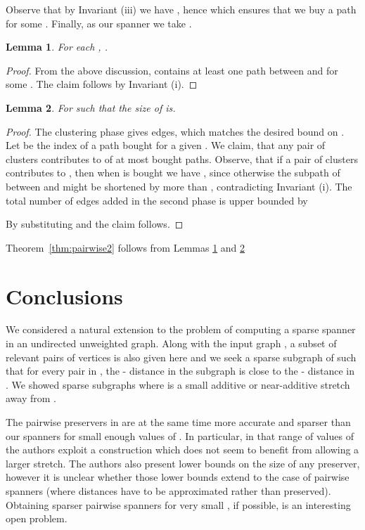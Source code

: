 \documentclass[a4paper,11pt]{article}
\newtheorem{lemma}{Lemma}[section]
\theoremstyle{definition}
\begin{document}
Observe that by Invariant (iii) we have , hence  which ensures that we buy a path  for some . Finally, as our spanner  we take .




\begin{lemma}\label{lem:stretchPairwise2}
For each , .
\end{lemma}
\begin{proof}
From the above discussion,  contains at least one path  between  and  for some . The claim follows by Invariant (i). 
\end{proof}



\begin{lemma}\label{lem:sizePairwise2}
For  such that  the
size of  is\newline .
\end{lemma}

\begin{proof}
The clustering phase gives  edges, 
which matches the desired bound on .
Let  be the index of a path  bought for a given .
We claim, that any pair of clusters contributes 
to  of at most  bought paths.
Observe, that if a pair of clusters  contributes to ,
then when  is bought we have
, since otherwise
the subpath of  between  and  might be shortened 
by more than , contradicting Invariant (i).
The total number of edges added in the second phase is upper bounded by 

By substituting  and  the claim follows.
\end{proof}

Theorem~\ref{thm:pairwise2} follows from Lemmas \ref{lem:stretchPairwise2} and \ref{lem:sizePairwise2}


\section{Conclusions}

We considered a natural extension to the problem of computing a sparse spanner in an undirected unweighted graph. Along with the input
graph ,  a subset  of relevant pairs
of vertices is also given here and we seek a sparse subgraph  of  
such that for every 
pair  in , the - distance  in the subgraph is close to the 
- distance  in . We showed sparse subgraphs  where  is a small additive or near-additive stretch away from . 

The pairwise preservers in \cite{CE05} are at the same time more accurate and sparser than our spanners for small enough values of . In particular, in that range of values of  the authors exploit a construction which does not seem to benefit from allowing a larger stretch. The authors also present lower bounds on the size of any preserver, however it is unclear whether those lower bounds extend to the case of pairwise spanners (where distances have to be approximated rather than preserved). Obtaining sparser pairwise spanners for very small , if possible, is an interesting open problem.
\end{document}
